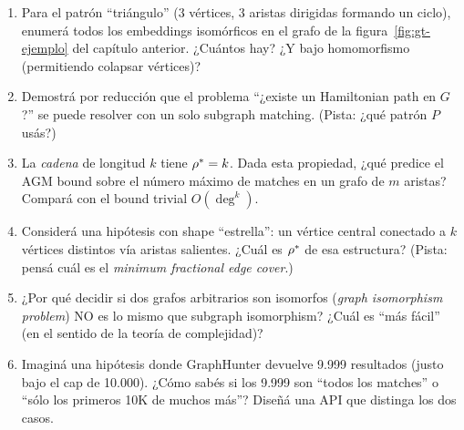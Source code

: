 \begin{ejercicios}
\begin{enumerate}
    \item \starred{} Para el patrón ``triángulo'' (3 vértices, 3
    aristas dirigidas formando un ciclo), enumerá todos los
    embeddings isomórficos en el grafo de la
    figura~\ref{fig:gt-ejemplo} del capítulo anterior. ¿Cuántos hay?
    ¿Y bajo homomorfismo (permitiendo colapsar vértices)?

    \item Demostrá por reducción que el problema ``¿existe un
    Hamiltonian path en \(G\)?'' se puede resolver con un solo subgraph
    matching. (Pista: ¿qué patrón \(P\) usás?)

    \item \starred{} La \emph{cadena} de longitud \(k\) tiene
    \(\rho^{*} = k\). Dada esta propiedad, ¿qué predice el AGM bound
    sobre el número máximo de matches en un grafo de \(m\) aristas?
    Compará con el bound trivial \(O(\deg^k)\).

    \item Considerá una hipótesis con shape ``estrella'': un vértice
    central conectado a \(k\) vértices distintos vía aristas
    salientes. ¿Cuál es \(\rho^{*}\) de esa estructura? (Pista:
    pensá cuál es el \emph{minimum fractional edge cover}.)

    \item ¿Por qué decidir si dos grafos arbitrarios son isomorfos
    (\emph{graph isomorphism problem}) NO es lo mismo que subgraph
    isomorphism? ¿Cuál es ``más fácil'' (en el sentido de la teoría
    de complejidad)?

    \item Imaginá una hipótesis donde GraphHunter devuelve 9.999
    resultados (justo bajo el cap de 10.000). ¿Cómo sabés si los
    9.999 son ``todos los matches'' o ``sólo los primeros 10K de
    muchos más''? Diseñá una API que distinga los dos casos.
\end{enumerate}
\end{ejercicios}
